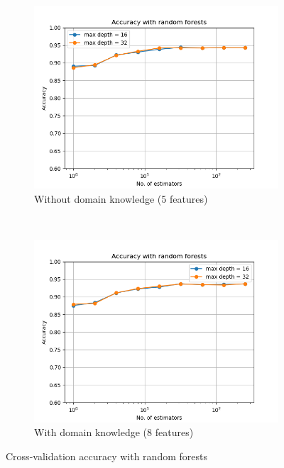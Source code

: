 \documentclass{article}
\begin{document}
\begin{figure}[h!]
    \centering
    \begin{subfigure}[b]{0.45\textwidth}
        \includegraphics[width=\textwidth]{../figures/wo_domain_knowledge/accuracy_rand_forests.png}
        \caption{Without domain knowledge (5  features)}
        \label{fig:rf_wo}
    \end{subfigure}
    ~ %
    \begin{subfigure}[b]{0.45\textwidth}
        \includegraphics[width=\textwidth]{../figures/w_domain_knowledge/accuracy_rand_forests.png}
        \caption{With domain knowledge (8  features)}
        \label{fig:rf_w}
    \end{subfigure}
    \caption{Cross-validation accuracy with random forests}\label{fig:rf}
\end{figure}
\end{document}
